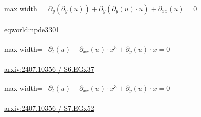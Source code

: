 \documentclass[UTF8,10pt,a4paper,fontset=mac]{ctexart}
\begin{document}
\begin{minipage}{\linewidth}\begin{center}\begin{adjustbox}{max width=\linewidth}$\displaystyle\begin{gathered}\begin{gathered}\partial_{y}(\partial_{y}(u))+\partial_{y}(\partial_{y}(u)\cdot u)+\partial_{xx}(u)=0\end{gathered}\end{gathered}$\end{adjustbox}\end{center}{\small\href{https://eqworld.ipmnet.ru/en/solutions/npde/npde3301.pdf}{eqworld:npde3301}}\par\end{minipage}\par\vspace{6mm}

\begin{minipage}{\linewidth}\begin{center}\begin{adjustbox}{max width=\linewidth}$\displaystyle\begin{gathered}\begin{gathered}\partial_{t}(u)+\partial_{xx}(u)\cdot x^{5}+\partial_{y}(u)\cdot x=0\end{gathered}\end{gathered}$\end{adjustbox}\end{center}{\small\href{https://arxiv.org/html/2407.10356#S6.EGx37}{arxiv:2407.10356 / S6.EGx37}}\par\end{minipage}\par\vspace{6mm}

\begin{minipage}{\linewidth}\begin{center}\begin{adjustbox}{max width=\linewidth}$\displaystyle\begin{gathered}\begin{gathered}\partial_{t}(u)+\partial_{xx}(u)\cdot x^{3}+\partial_{y}(u)\cdot x=0\end{gathered}\end{gathered}$\end{adjustbox}\end{center}{\small\href{https://arxiv.org/html/2407.10356#S7.EGx52}{arxiv:2407.10356 / S7.EGx52}}\par\end{minipage}\par\vspace{6mm}
\end{document}
